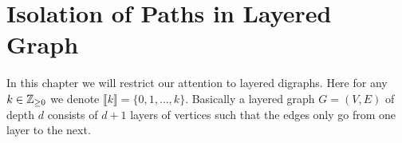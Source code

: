 \chapter{Isolation of Paths in Layered Graph}
\cite{MelkebeekPrakriya_2019_DIi}
In this chapter we will restrict our attention to layered digraphs. Here for any $k\in\mathbb{Z}_{\geq 0}$ we denote $\llbracket k\rrbracket=\{0,1,\dots, k\}$.
Basically a layered graph $G=(V,E)$ of depth $d$ consists of $d+1$ layers of vertices such that the edges only go from one layer to the next.